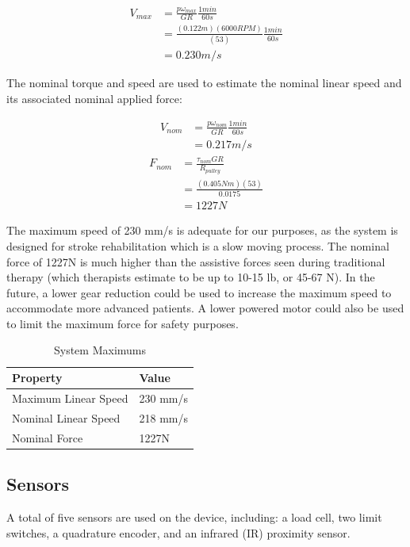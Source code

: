 \documentclass[12pt]{report}
\begin{document}
	\begin{align*}
		V_{max} &= \frac{p\omega _{max}}{GR} \frac{1min}{60s} \\
		&= \frac{(0.122m)(6000 RPM)}{(53)} \frac{1min}{60s} \\
		&= 0.230 m/s
	\end{align*}
	
	The nominal torque and speed are used to estimate the nominal linear speed and its associated nominal applied force:
	
	\begin{align*}
		V_{nom} &= \frac{p\omega _{nom}}{GR} \frac{1min}{60s} \\
		&= 0.217 m/s
	\end{align*}
	\begin{align*}
		F_{nom} &= \frac{\tau _{nom}GR}{R_{pulley}} \\
		&= \frac{(0.405Nm)(53)}{0.0175} \\
		&= 1227N 
	\end{align*}

The maximum speed of 230 mm/s is adequate for our purposes, as the system is designed for stroke rehabilitation which is a slow moving process. The nominal force of 1227N  is much higher than the assistive forces seen during traditional therapy (which therapists estimate to be up to 10-15 lb, or 45-67 N). In the future, a lower gear reduction could be used to increase the maximum speed to accommodate more advanced patients. A lower powered motor could also be used to limit the maximum force for safety purposes. 

	\begin{table}[h]
	\centering
	\caption{System Maximums}	
	\begin{tabular}{|l|l|}
		\hline
		\rowcolor{gray!10} \textbf{Property} & \textbf{Value}  \\ \hline
 		Maximum Linear Speed & 230 mm/s \\ \hline
 		Nominal Linear Speed & 218 mm/s \\ \hline
 		Nominal Force & 1227N  \\ \hline
		\end{tabular}
	\label{tab:gear}
	\end{table}		
		
		
		\subsection{Sensors}

	A total of five sensors are used on the device, including: a load cell, two limit switches, a quadrature encoder, and an infrared (IR) proximity sensor. 
	
\end{document}

